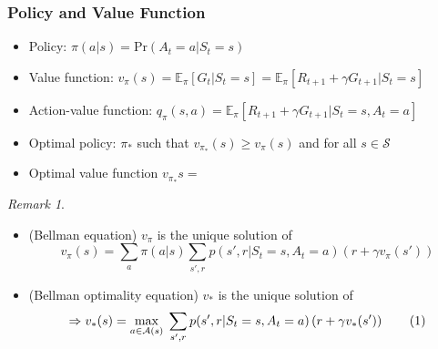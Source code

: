 \documentclass[10pt]{beamer}
\theoremstyle{remark}
\newtheorem{remark}{Remark}[section]
\newcommand\numberthis{\addtocounter{equation}{1}\tag{\theequation}} %
\begin{document}
\begin{frame}[t]
    \frametitle{Policy and Value Function}
    \begin{definition}
    \begin{itemize}
        \item Policy: $ \pi(a|s) = \text{Pr}(A_t =a| S_t = s)$
        \item Value function: 
            $ v_\pi(s) = \mathbb{E}_{\pi}[G_t | S_t =s] = \mathbb{E}_{\pi} \left[ R_{t+1} + \gamma G_{t+1} | S_t =s \right] $ 

        \item Action-value function: 
             $ q_\pi(s, a) = \mathbb{E}_{\pi} \left[ R_{t+1} + \gamma G_{t+1} | S_t=s, A_t=a \right] $ 

        \item Optimal policy: $\pi_{\ast}$ such that $v_{\pi_\ast}(s) \geq v_{\pi}(s)$ and for all $s \in \mathcal{S}$
        \item Optimal value function $v_{\pi_\ast}{s} =  $
    \end{itemize}
    \end{definition}
    \begin{remark}
        \begin{itemize}
            \item (Bellman equation) $v_\pi$ is the unique solution of
            \begin{equation*}
                 v_\pi(s) = \sum_{a} \pi(a|s) \sum_{s', r} p(s', r| S_t = s, A_t = a) \left( r + \gamma v_\pi(s') \right) 
            \end{equation*}
            \item (Bellman optimality equation) $v_{\ast}$ is the unique solution of
                \[
        \Rightarrow v_{\ast}(s) = \max_{a \in \mathcal{A}(s)} \; \sum_{s', r} p(s', r|  S_t =s, A_t = a)  \left( r + \gamma v_{\ast} (s') \right) \numberthis \label{eq:bellman_optim}
                \] 
        \end{itemize}
    \end{remark}
\end{frame}
\end{document}
